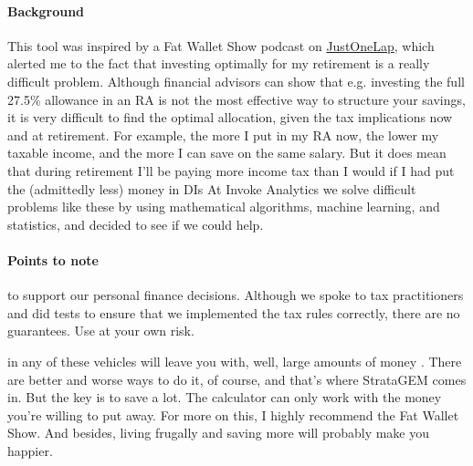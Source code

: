 \documentclass[a4paper, justified]{tufte-handout}
\begin{document}
\paragraph{Background} This tool was inspired by a Fat Wallet Show podcast on \href{https://justonelap.com/podcast-can-one-etf-rule/}{JustOneLap}, which alerted me to the fact that investing optimally for my retirement is a really difficult problem. Although financial advisors can show that e.g. investing the full 27.5\% allowance in an RA is not the most effective way to structure your savings, it is very difficult to find the optimal allocation, given the tax implications now and at retirement. For example, the more I put in my RA now, the lower my taxable income, and the more I can save on the same salary. But it does mean that during retirement I'll be paying more income tax than I would if I had put the (admittedly less) money in DIs
At Invoke Analytics we solve difficult problems like these by using mathematical algorithms, machine learning, and statistics, and decided to see if we could help. 

\paragraph{Points to note}  to support our personal finance decisions. Although we spoke to tax practitioners and did tests to ensure that we implemented the tax rules correctly, there are no guarantees. Use at your own risk.

 in any of these vehicles will leave you with, well, large amounts of money . There are better and worse ways to do it, of course, and that's where StrataGEM comes in. But the key is to save a lot. The calculator can only work with the money you're willing to put away. For more on this, I highly recommend the Fat Wallet Show. And besides, living frugally and saving more will probably make you happier.
\end{document}
